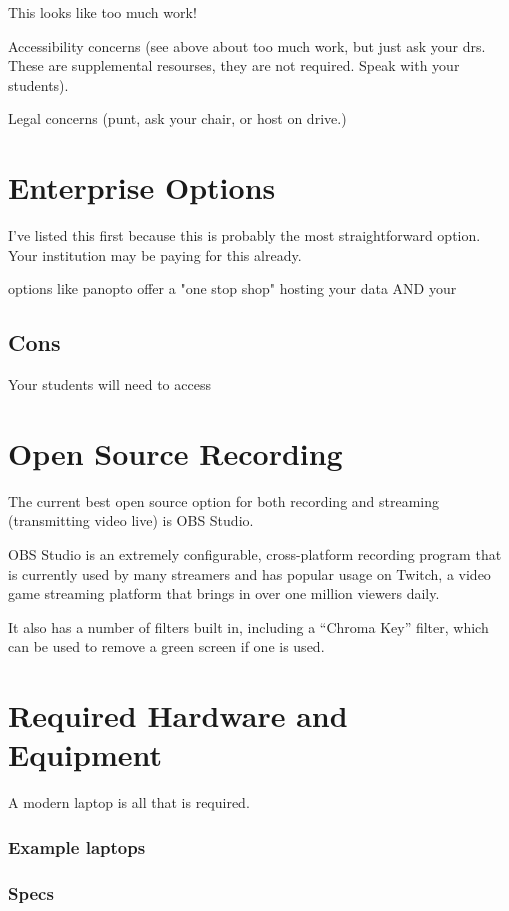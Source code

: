\documentclass[sigconf]{acmart}
\begin{document}
This looks like too much work!

Accessibility concerns (see above about too much work, but just ask your drs.  These are supplemental resourses, they are not required.  Speak with your students).

Legal concerns (punt, ask your chair, or host on drive.)

\section{Enterprise Options}
I've listed this first because this is probably the most straightforward option.
Your institution may be paying for this already.




options like panopto  offer a "one stop shop" hosting your data AND your


\subsection{Cons}
Your students will need to access

\section{Open Source Recording}
The current best open source option for both recording and streaming (transmitting video live) is OBS Studio.

OBS Studio is an extremely configurable, cross-platform recording program that is currently used by many streamers and has popular usage on Twitch, a video game streaming platform that brings in over one million viewers daily.

It also has a number of filters built in, including a  ``Chroma Key'' filter, which can be used to remove a green screen if one is used.



\section{Required Hardware and Equipment}
A modern laptop is all that is required.

\subsubsection{Example laptops}
\subsubsection{Specs}
\end{document}
